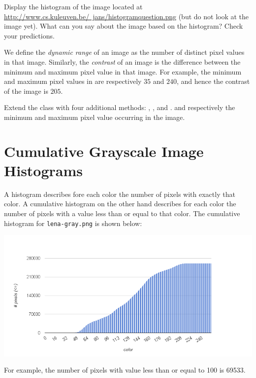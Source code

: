 \documentclass{book}
\begin{document}
\begin{exercise}
Display the histogram of the image located at \href{http://www.cs.kuleuven.be/~jans/histogramquestion.png}{http://www.cs.kuleuven.be/~jans/histogramquestion.png} (but do not look at the image yet). What can you say about the image based on the histogram? Check your predictions. 
\end{exercise}

We define the \emph{dynamic range} of an image as the number of distinct pixel values in that image. Similarly, the \emph{contrast} of an image is the difference between the minimum and maximum pixel value in that image. For example, the minimum and maximum pixel values in  are respectively $35$ and $240$, and hence the contrast of the image is $205$.

\begin{exercise}
Extend the class  with four additional methods: , ,  and .  and  respectively the minimum and maximum pixel value occurring in the image. 
\end{exercise}

\section{Cumulative Grayscale Image Histograms}
A histogram describes fore each color the number of pixels with exactly that color. A cumulative histogram on the other hand describes for each color the number of pixels with a value less than or equal to that color. The cumulative histogram for \texttt{lena-gray.png} is shown below:
\begin{center}
\includegraphics[scale=0.5]{lena-gray-cumulative-histogram.png}
\end{center}
For example, the number of pixels with value less than or equal to 100 is 69533.
\end{document}
